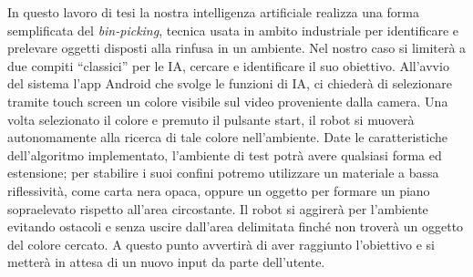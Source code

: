 In questo lavoro di tesi la nostra intelligenza artificiale realizza una forma semplificata del \emph{bin-picking},
tecnica usata in ambito industriale per identificare e prelevare oggetti 
disposti alla rinfusa in un ambiente.\cite{bin-picking} Nel nostro caso si limiterà a due compiti 
``classici'' per le IA, cercare e identificare 
il suo obiettivo. All'avvio del sistema l'app Android che svolge le funzioni di IA,
ci chiederà di selezionare tramite touch screen un colore visibile sul video 
proveniente dalla camera. Una volta selezionato il colore e premuto il pulsante start, 
il robot si muoverà autonomamente alla ricerca di tale colore nell'ambiente. 
Date le caratteristiche dell'algoritmo implementato, l'ambiente di test potrà 
avere qualsiasi forma ed estensione; per stabilire i suoi confini potremo utilizzare 
un materiale a bassa riflessività, come carta nera opaca, oppure un oggetto per 
formare un piano sopraelevato rispetto all'area circostante.
Il robot si aggirerà per l'ambiente evitando ostacoli e senza 
uscire dall'area delimitata finché non troverà un oggetto del colore cercato. 
A questo punto avvertirà di aver raggiunto l'obiettivo e si metterà in attesa di un nuovo 
input da parte dell'utente.